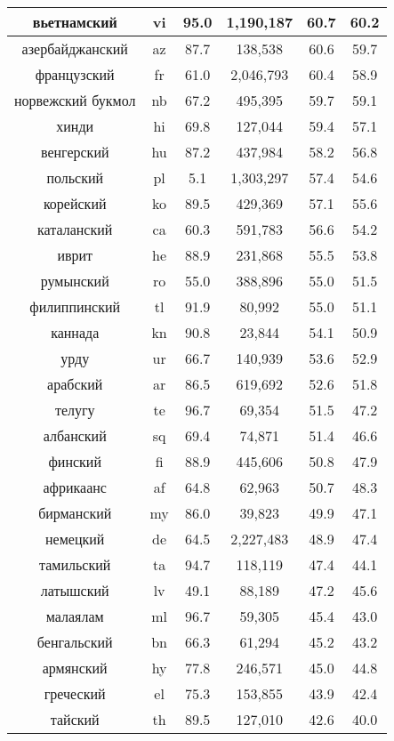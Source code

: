 \begin{table*}
{\begin{tabular}{|c|c|c||c|c|c|}
вьетнамский & vi & 95.0 & 1,190,187 & 60.7 & 60.2\\ \hline
азербайджанский & az & 87.7 & 138,538 & 60.6 & 59.7\\ \hline
французский & fr & 61.0 & 2,046,793 & 60.4 & 58.9\\ \hline
норвежский букмол & nb & 67.2 & 495,395 & 59.7 & 59.1\\ \hline
хинди & hi & 69.8 & 127,044 & 59.4 & 57.1\\ \hline
венгерский & hu & 87.2 & 437,984 & 58.2 & 56.8\\ \hline
польский & pl & 5.1 & 1,303,297 & 57.4 & 54.6\\ \hline
корейский & ko & 89.5 & 429,369 & 57.1 & 55.6\\ \hline
каталанский & ca & 60.3 & 591,783 & 56.6 & 54.2\\ \hline
иврит & he & 88.9 & 231,868 & 55.5 & 53.8\\ \hline
румынский & ro & 55.0 & 388,896 & 55.0 & 51.5\\ \hline
филиппинский & tl & 91.9 & 80,992 & 55.0 & 51.1\\ \hline
каннада & kn & 90.8 & 23,844 & 54.1 & 50.9\\ \hline
урду & ur & 66.7 & 140,939 & 53.6 & 52.9\\ \hline
арабский & ar & 86.5 & 619,692 & 52.6 & 51.8\\ \hline
телугу & te & 96.7 & 69,354 & 51.5 & 47.2\\ \hline
албанский & sq & 69.4 & 74,871 & 51.4 & 46.6\\ \hline
финский & fi & 88.9 & 445,606 & 50.8 & 47.9\\ \hline
африкаанс & af & 64.8 & 62,963 & 50.7 & 48.3\\ \hline
бирманский & my & 86.0 & 39,823 & 49.9 & 47.1\\ \hline
немецкий & de & 64.5 & 2,227,483 & 48.9 & 47.4\\ \hline
тамильский & ta & 94.7 & 118,119 & 47.4 & 44.1\\ \hline
латышский & lv & 49.1 & 88,189 & 47.2 & 45.6\\ \hline
малаялам & ml & 96.7 & 59,305 & 45.4 & 43.0\\ \hline
бенгальский & bn & 66.3 & 61,294 & 45.2 & 43.2\\ \hline
армянский & hy & 77.8 & 246,571 & 45.0 & 44.8\\ \hline
греческий & el & 75.3 & 153,855 & 43.9 & 42.4\\ \hline
тайский & th & 89.5 & 127,010 & 42.6 & 40.0\\ \hline

\end{tabular}}
\end{table*}
